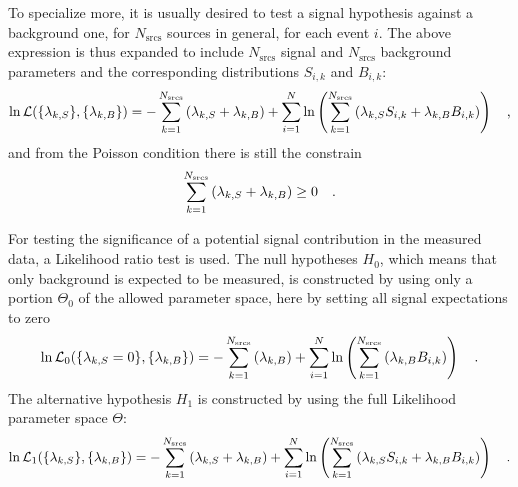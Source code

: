 To specialize more, it is usually desired to test a signal hypothesis against a background one, for $N_\text{srcs}$ sources in general, for each event $i$.
The above expression is thus expanded to include $N_\text{srcs}$ signal and $N_\text{srcs}$ background parameters and the corresponding distributions $S_{i,k}$ and $B_{i,k}$:
\begin{equation}
  \ln\mathcal{L}(\{\lambda_{k,S}\}, \{\lambda_{k,B}\})
  = -\sum_{k=1}^{N_\text{srcs}}\left(\lambda_{k,S}+\lambda_{k,B}\right) +
    \sum_{i=1}^N \ln\left(\sum_{k=1}^{N_\text{srcs}}\left(
      \lambda_{k,S} S_{i,k}+\lambda_{k,B} B_{i,k}\right)\right)
  \quad\text{,}
\end{equation}
and from the Poisson condition there is still the constrain
\begin{equation}
  \sum_{k=1}^{N_\text{srcs}}\left(\lambda_{k,S}+\lambda_{k,B}\right) \geq 0
  \quad\text{.}
\end{equation}

For testing the significance of a potential signal contribution in the measured data, a Likelihood ratio test is used.
The null hypotheses $H_0$, which means that only background is expected to be measured, is constructed by using only a portion $\Theta_0$ of the allowed parameter space, here by setting all signal expectations to zero
\begin{equation}
  \ln\mathcal{L}_0(\{\lambda_{k,S}=0\}, \{\lambda_{k,B}\})
  = -\sum_{k=1}^{N_\text{srcs}}\left(\lambda_{k,B}\right) +
    \sum_{i=1}^N \ln\left(\sum_{k=1}^{N_\text{srcs}}\left(
      \lambda_{k,B} B_{i,k}\right)\right)
  \quad\text{.}
\end{equation}
The alternative hypothesis $H_1$ is constructed by using the full Likelihood parameter space $\Theta$:
\begin{equation}
  \ln\mathcal{L}_1(\{\lambda_{k,S}\}, \{\lambda_{k,B}\})
  = -\sum_{k=1}^{N_\text{srcs}}\left(\lambda_{k,S}+
                                     \lambda_{k,B}\right) +
    \sum_{i=1}^N \ln\left(\sum_{k=1}^{N_\text{srcs}}\left(
      \lambda_{k,S} S_{i,k}+\lambda_{k,B} B_{i,k}\right)\right)
  \quad\text{.}
\end{equation}

